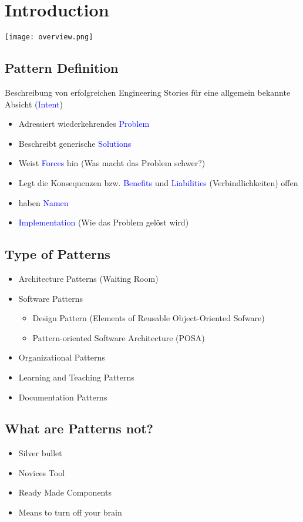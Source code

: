 
\section{Introduction}

\texttt{[image: overview.png]}

\subsection{Pattern Definition}
Beschreibung von erfolgreichen Engineering Stories für eine allgemein bekannte Absicht (\textcolor{blue}{Intent})

\begin{itemize}
    \item Adressiert wiederkehrendes \textcolor{blue}{Problem}
    \item Beschreibt generische \textcolor{blue}{Solutions}
    \item Weist \textcolor{blue}{Forces} hin (Was macht das Problem schwer?)
    \item Legt die Konsequenzen bzw. \textcolor{blue}{Benefits} und \textcolor{blue}{Liabilities} (Verbindlichkeiten) offen
    \item haben \textcolor{blue}{Namen}
    \item \textcolor{blue}{Implementation} (Wie das Problem gelöst wird)
\end{itemize}

\subsection{Type of Patterns}
\begin{itemize}
    \item Architecture Patterns (Waiting Room)
    \item Software Patterns
    \begin{itemize}
        \item Design Pattern (Elements of Reusable Object-Oriented Sofware)
        \item Pattern-oriented Software Architecture (POSA)
    \end{itemize}
    \item Organizational Patterns
    \item Learning and Teaching Patterns
    \item Documentation Patterns
\end{itemize}

\subsection{What are Patterns not?}
\begin{itemize}
    \item Silver bullet
    \item Novices Tool
    \item Ready Made Components
    \item Means to turn off your brain
\end{itemize}
